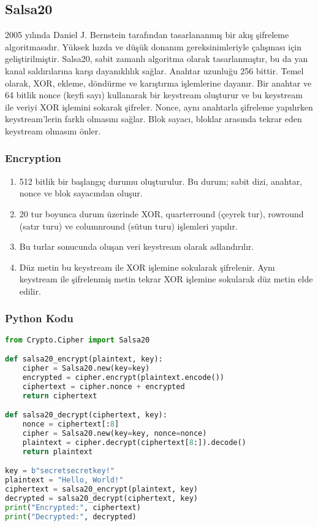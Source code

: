 \newpage

\subsection{Salsa20}

2005 yılında Daniel J. Bernstein tarafından tasarlananmış bir akış şifreleme algoritmasıdır. Yüksek hızda ve düşük donanım gereksinimleriyle çalışması için geliştirilmiştir. Salsa20, sabit zamanlı algoritma olarak tasarlanmıştır, bu da yan kanal saldırılarına karşı dayanıklılık sağlar. Anahtar uzunluğu 256 bittir. Temel olarak, XOR, ekleme, döndürme ve karıştırma işlemlerine dayanır. Bir anahtar ve 64 bitlik nonce (keyfi sayı) kullanarak bir keystream oluşturur ve bu keystream ile veriyi XOR işlemini sokarak şifreler. Nonce, aynı anahtarla şifreleme yapılırken keystream'lerin farklı olmasını sağlar. Blok sayacı, bloklar arasında tekrar eden keystream olmasını önler.

\subsubsection{Encryption}

\begin{enumerate}
    \item 512 bitlik bir başlangıç durumu oluşturulur. Bu durum; sabit dizi, anahtar, nonce ve blok sayacından oluşur.
    \item 20 tur boyunca durum üzerinde XOR, quarterround (çeyrek tur), rowround (satır turu) ve columnround (sütun turu) işlemleri yapılır.
    \item Bu turlar sonucunda oluşan veri keystream olarak adlandırılır.
    \item Düz metin bu keystream ile XOR işlemine sokularak şifrelenir. Aynı keystream ile şifrelenmiş metin tekrar XOR işlemine sokularak düz metin elde edilir.
\end{enumerate}

\subsubsection{Python Kodu}

\begin{lstlisting}[language=Python]
from Crypto.Cipher import Salsa20

def salsa20_encrypt(plaintext, key):
    cipher = Salsa20.new(key=key)
    encrypted = cipher.encrypt(plaintext.encode())
    ciphertext = cipher.nonce + encrypted
    return ciphertext

def salsa20_decrypt(ciphertext, key):
    nonce = ciphertext[:8]
    cipher = Salsa20.new(key=key, nonce=nonce)
    plaintext = cipher.decrypt(ciphertext[8:]).decode()
    return plaintext

key = b"secretsecretkey!"
plaintext = "Hello, World!"
ciphertext = salsa20_encrypt(plaintext, key)
decrypted = salsa20_decrypt(ciphertext, key)
print("Encrypted:", ciphertext)
print("Decrypted:", decrypted)
\end{lstlisting}

